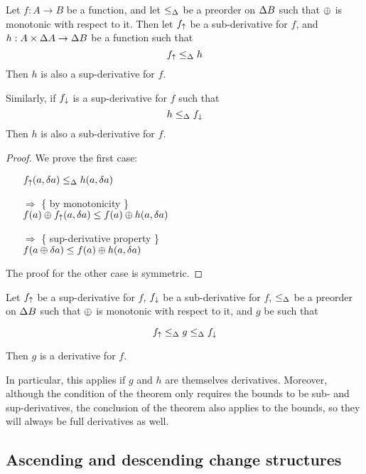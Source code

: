 \begin{thm}
  Let $f: A \rightarrow B$ be a function, and let $\leq_\Delta$ be a preorder on $\Delta B$ such that $\oplus$ is monotonic with
  respect to it. Then let $f_\uparrow$ be a sub-derivative for $f$, and $h: A \times
  \Delta A \rightarrow \Delta B$ be a function such that
  $$f_\uparrow \leq_\Delta h$$
  Then $h$ is also a sup-derivative for $f$.

  Similarly, if $f_\downarrow$ is a sup-derivative for $f$ such that 
  $$h \leq_\Delta f_\downarrow$$
  Then $h$ is also a sub-derivative for $f$.
\end{thm}
\begin{proof}
  We prove the first case:
  \begin{itemize}
    \item[ ]$f_\uparrow(a, \delta a) \leq_\Delta h(a, \delta a)$
    \item[$\Rightarrow$]\{ by monotonicity \}\\
      $f(a) \oplus f_\uparrow(a, \delta a) \leq f(a) \oplus h(a, \delta a)$
    \item[$\Rightarrow$]\{ sup-derivative property \}\\
      $f(a \oplus \delta a) \leq f(a) \oplus h(a, \delta a)$
  \end{itemize}

  The proof for the other case is symmetric.
\end{proof}

\begin{thm}
  \label{thm:sandwich}
  Let $f_\uparrow$ be a sup-derivative for $f$, $f_\downarrow$ be a sub-derivative for $f$, $\leq_\Delta$ be a preorder on $\Delta B$ such that $\oplus$ is monotonic with
  respect to it, and $g$ be such that

  $$f_\uparrow \leq_\Delta g \leq_\Delta f_\downarrow$$

  Then $g$ is a derivative for $f$.
\end{thm}

In particular, this applies if $g$ and $h$ are themselves derivatives. Moreover,
although the condition of the theorem only requires the bounds to be sub- and
sup-derivatives, the conclusion of the theorem also applies to the bounds, so
they will always be full derivatives as well.

\subsection{Ascending and descending change structures}

